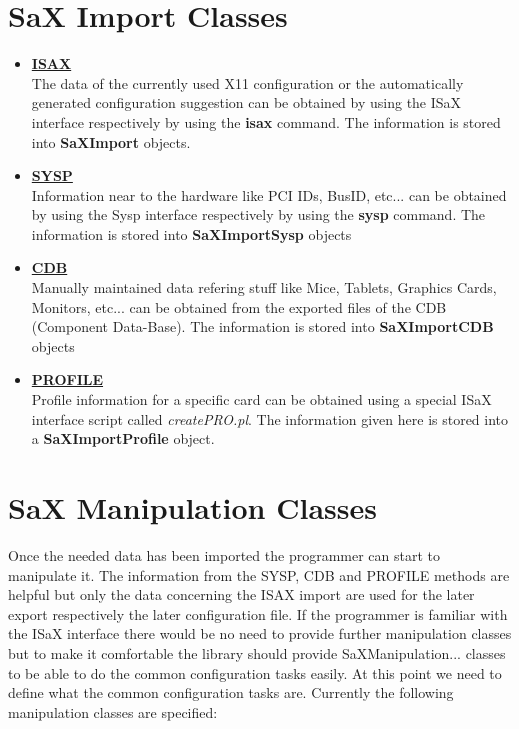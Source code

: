 \section{SaX Import Classes}
\begin{itemize}
\item \textbf{\underline{ISAX}}\\
      The data of the currently used X11 configuration or the automatically
      generated configuration suggestion can be obtained by using the ISaX
      interface respectively by using the \textbf{isax} command. The
      information is stored into \textbf{SaXImport} objects.
\item \textbf{\underline{SYSP}}\\
      Information near to the hardware like PCI IDs, BusID, etc... can be
      obtained by using the Sysp interface respectively by using the
      \textbf{sysp} command. The information is stored into
      \textbf{SaXImportSysp} objects
\item \textbf{\underline{CDB}}\\
      Manually maintained data refering stuff like Mice, Tablets,
      Graphics Cards, Monitors, etc... can be obtained from the exported
      files of the CDB (Component Data-Base). The information is stored
      into \textbf{SaXImportCDB} objects
\item \textbf{\underline{PROFILE}}\\
      Profile information for a specific card can be obtained using a
      special ISaX interface script called \textit{createPRO.pl}. The
      information given here is stored into a \textbf{SaXImportProfile}
      object.
\end{itemize}

\newpage

\section{SaX Manipulation Classes}
Once the needed data has been imported the programmer can start to
manipulate it. The information from the SYSP, CDB and PROFILE methods
are helpful but only the data concerning the ISAX import are used for
the later export respectively the later configuration file. If the
programmer is familiar with the ISaX interface there would be no need
to provide further manipulation classes but to make it comfortable
the library should provide SaXManipulation... classes to be able to
do the common configuration tasks easily. At this point we need to
define what the common configuration tasks are. Currently the following
manipulation classes are specified:

